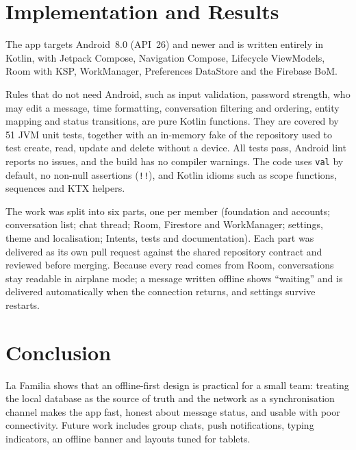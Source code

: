 \documentclass[sigconf,nonacm]{acmart}
\begin{document}
\section{Implementation and Results}
The app targets Android~8.0 (API~26) and newer and is written entirely in Kotlin, with
Jetpack Compose, Navigation Compose, Lifecycle ViewModels, Room with KSP, WorkManager,
Preferences DataStore and the Firebase BoM.

Rules that do not need Android, such as input validation, password strength, who may
edit a message, time formatting, conversation filtering and ordering, entity mapping and
status transitions, are pure Kotlin functions. They are covered by 51 JVM unit tests,
together with an in-memory fake of the repository used to test create, read, update and
delete without a device. All tests pass, Android lint reports no issues, and the build
has no compiler warnings. The code uses \texttt{val} by default, no non-null assertions
(\texttt{!!}), and Kotlin idioms such as scope functions, sequences and KTX helpers.

The work was split into six parts, one per member (foundation and accounts; conversation
list; chat thread; Room, Firestore and WorkManager; settings, theme and localisation;
Intents, tests and documentation). Each part was delivered as its own pull request
against the shared repository contract and reviewed before merging. Because every read
comes from Room, conversations stay readable in airplane mode; a message written offline
shows ``waiting'' and is delivered automatically when the connection returns, and
settings survive restarts.

\section{Conclusion}
La Familia shows that an offline-first design is practical for a small team: treating
the local database as the source of truth and the network as a synchronisation channel
makes the app fast, honest about message status, and usable with poor connectivity.
Future work includes group chats, push notifications, typing indicators, an offline
banner and layouts tuned for tablets.

\end{document}
